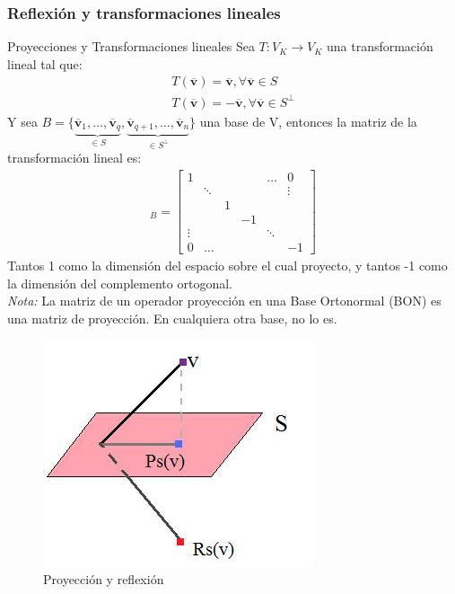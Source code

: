 \documentclass[a4paper, twoside]{article}
\numberwithin{equation}{section}
\numberwithin{figure}{section}
\numberwithin{table}{section}
\newcommand{\vect}[1]{\overline{\textbf{#1}}}
\begin{document}
\subsubsection{Reflexión y transformaciones lineales}
\begin{minipage}{0.6\textwidth}
	\begin{definicion*}{Proyecciones y Transformaciones lineales}
		Sea $T:V_K \to V_K$ una transformación lineal tal que:
		\begin{align}
			T(\vect{v})=\vect{v}, \forall \vect{v} \in S \\
			T(\vect{v})=-\vect{v}, \forall \vect{v} \in S^\bot
		\end{align}
		Y sea $B = \{ \underbrace{ \vect{v}_1, \ldots, \vect{v}_q }_{\in S}, \underbrace{ \vect{v}_{q+1}, \ldots, \vect{v}_n }_{\in S^\bot} \}$ una base de V, entonces la matriz de la transformación lineal es:
		\begin{align}
			[T]_B = \begin{bmatrix}
						{1} & { } & { } & { } & {\ldots} & {0} \\
						{ } & {\ddots} & { } & { } & { } & {\vdots} \\
						{ } & { } & {1} & { } & { } & { } \\
						{ } & { } & { } & {-1} & { } & { } \\
						{\vdots} & { } & { } & { } & {\ddots} & { } \\
						{0} & {\ldots} & { } & { } & { } & {-1}
					\end{bmatrix}
		\end{align}
		Tantos 1 como la dimensión del espacio sobre el cual proyecto, y tantos -1 como la dimensión del complemento ortogonal.\\
				
		\emph{Nota:} La matriz de un operador proyección en una Base Ortonormal (BON) es una matriz de proyección. En cualquiera otra base, no lo es.
	\end{definicion*}
\end{minipage}
\begin{minipage}{0.3\textwidth}
	\begin{figure}[H]
		\begin{center}
			\includegraphics[scale=0.5]{proyeccion}\caption{Proyección y reflexión}
		\end{center}
	\end{figure}
\end{minipage}
\end{document}
